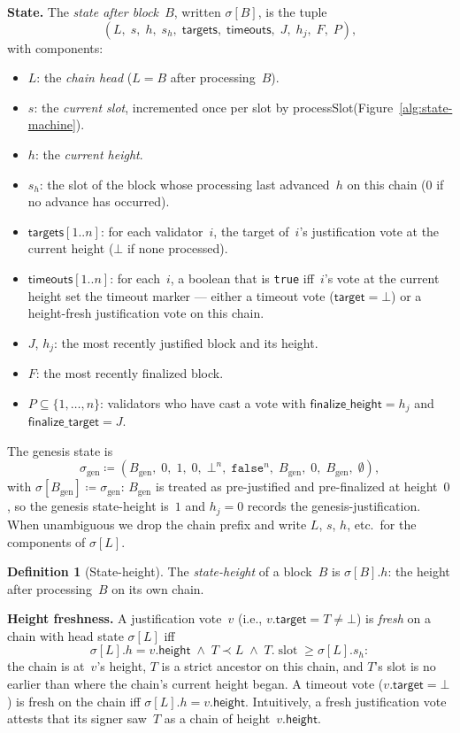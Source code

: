 \ifx\litemode\undefined\documentclass{article}\fi
\newcommand{\genesis}{\ensuremath{B_{\mathrm{gen}}}}
\newcommand{\slot}[0]{\ensuremath{\operatorname{\mathrm{slot}}}}
\newcommand{\target}{\mathsf{target}}
\newcommand{\height}{\mathsf{height}}
\newcommand{\finalizeHeight}{\mathsf{finalize\_height}}
\newcommand{\finalizeTarget}{\mathsf{finalize\_target}}
\newcommand{\targets}{\mathsf{targets}}
\newcommand{\timeouts}{\mathsf{timeouts}}
\newcommand{\processSlot}{\textsf{processSlot}\xspace}
\renewcommand{\paragraph}[1]{\vspace{7pt}\noindent\textbf{#1}}
\theoremstyle{plain}
\theoremstyle{definition}
\newtheorem{definition}{Definition}
\theoremstyle{remark}
\begin{document}
\paragraph{State.}
The \emph{state after block~$B$}, written $\sigma[B]$, is the tuple
\[
  (L,\; s,\; h,\; s_h,\; \targets,\; \timeouts,\; J,\; h_j,\; F,\; P),
\]
with components:
\begin{itemize}
  \item $L$: the \emph{chain head} ($L = B$ after processing~$B$).
  \item $s$: the \emph{current slot}, incremented once per slot by \processSlot (Figure~\ref{alg:state-machine}).
  \item $h$: the \emph{current height}.
  \item $s_h$: the slot of the block whose processing last advanced~$h$ on this chain ($0$ if no advance has occurred).
  \item $\targets[1..n]$: for each validator~$i$, the target of~$i$'s justification vote at the current height ($\bot$ if none processed).
  \item $\timeouts[1..n]$: for each~$i$, a boolean that is \texttt{true} iff~$i$'s vote at the current height set the timeout marker --- either a timeout vote ($\target = \bot$) or a height-fresh justification vote on this chain.
  \item $J$, $h_j$: the most recently justified block and its height.
  \item $F$: the most recently finalized block.
  \item $P \subseteq \{1, \ldots, n\}$: validators who have cast a vote with $\finalizeHeight = h_j$ and $\finalizeTarget = J$.
\end{itemize}
The genesis state is
\[
  \sigma_{\mathrm{gen}} \coloneqq (\genesis,\; 0,\; 1,\; 0,\; \bot^n,\; \mathtt{false}^n,\; \genesis,\; 0,\; \genesis,\; \emptyset),
\]
with $\sigma[\genesis] \coloneqq \sigma_{\mathrm{gen}}$: $\genesis$ is treated as pre-justified and pre-finalized at height~$0$, so the genesis state-height is~$1$ and $h_j = 0$ records the genesis-justification.
When unambiguous we drop the chain prefix and write $L$, $s$, $h$, etc.\ for the components of $\sigma[L]$.

\begin{definition}[State-height]\label{def:sheight}
The \emph{state-height} of a block~$B$ is $\sigma[B].h$: the height after processing~$B$ on its own chain.
\end{definition}

\paragraph{Height freshness.}
A justification vote~$v$ (i.e., $v.\target = T \neq \bot$) is \emph{fresh} on a chain with head state $\sigma[L]$ iff
\[
  \sigma[L].h = v.\height \;\wedge\; T \prec L \;\wedge\; T.\slot \geq \sigma[L].s_h:
\]
the chain is at~$v$'s height, $T$ is a strict ancestor on this chain, and $T$'s slot is no earlier than where the chain's current height began.
A timeout vote ($v.\target = \bot$) is fresh on the chain iff $\sigma[L].h = v.\height$.
Intuitively, a fresh justification vote attests that its signer saw~$T$ as a chain of height~$v.\height$.
\end{document}

